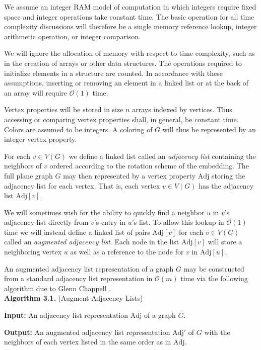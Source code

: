 \documentclass[letterpaper, 12pt]{article}
\theoremstyle{thm}
\begin{document}
We assume an integer RAM model of computation in which integers require
fixed space and integer operations take constant time. The basic operation
for all time complexity discussions will therefore be a single memory reference
lookup, integer arithmetic operation, or integer comparison.

We will ignore the allocation of memory with respect to time complexity, such
as in the creation of arrays or other data structures. The operations
required to initialize elements in a structure are counted. In accordance
with these assumptions, inserting or removing an element in a linked list or at
the back of an array will require $\mathcal{O}(1)$ time.

Vertex properties will be stored in size $n$ arrays indexed by vertices. Thus accessing
or comparing vertex properties shall, in general, be constant time. Colors are assumed to be integers. A coloring of $G$ will thus be represented by
an integer vertex property.

For each $v\in V(G)$ we define a linked list called an
\emph{adjacency list} containing the neighbors of $v$ ordered according to
the rotation scheme of the embedding. The full plane graph $G$ may then
represented by a vertex property $\text{Adj}$ storing the adjacency list for
each vertex. That is, each vertex $v\in V(G)$ has the adjacency list $\text{Adj}[v]$.

We will sometimes wish for the ability to quickly find a neighbor $u$
in $v$'s adjacency list directly from $v$'s entry in $u$'s list. To allow this lookup in
$\mathcal{O}(1)$ time we will instead define a linked list of pairs $\text{Adj}[v]$ for
each $v\in V(G)$ called an \textit{augmented adjacency list}. Each node in the
list $\text{Adj}[v]$ will store a neighboring vertex $u$ as well as a reference
to the node for $v$ in $\text{Adj}[u]$.

An augmented adjacency list
representation of a graph $G$ may be constructed from a standard adjacency list
representation in $\mathcal{O}(m)$ time via the following algorithm due to 
Glenn Chappell \cite{chappell}.\\

\noindent\textbf{Algorithm 3.1.} (Augment Adjacency Lists)

\noindent\textbf{Input:} An adjacency list representation $\text{Adj}$ of a
graph $G$.

\noindent\textbf{Output:} An augmented adjacency list representation
$\text{Adj}'$ of $G$ with the neighbors of each vertex listed in the same order
as in $\text{Adj}$.
\end{document}
